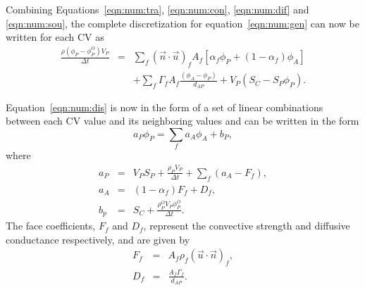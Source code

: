 Combining Equations~\eqref{eqn:num:tra}, \eqref{eqn:num:con},
\eqref{eqn:num:dif} and \eqref{eqn:num:sou}, the complete
discretization for equation~\eqref{eqn:num:gen} can now be written for
each CV as
\begin{eqnarray}
\frac{\rho(\phi_{P} - \phi_P^O) V_P}{\Delta t}
&=&
\sum_{f} (\vec{n} \cdot \vec{u})_f A_f 
\left[\alpha_f \phi_P +\left(1-\alpha_f\right)\phi_A\right]
\\
&&+
\sum_f \Gamma_f A_f \frac{(\phi_A-\phi_P)}{d_{AP}}
+ 
V_P ( S_C - S_P \phi_P ).
\label{eqn:num:dis}
\end{eqnarray}

Equation~\eqref{eqn:num:dis} is now in the form of a set of linear
combinations between each CV value and its neighboring values and can be
written in the form
\begin{equation}
a_P \phi_P = \sum_f a_{A} \phi_{A} + b_P,
\label{eqn:num:dap}
\end{equation}
where
\begin{eqnarray}
a_P & = & V_P S_P + \frac{\rho_P V_P}{\Delta t} + \sum_f (a_{A} -
F_f), \\
a_{A} & = & ( 1 - \alpha_f ) F_f + D_f, \\
b_p & = & S_C + \frac{\rho_P^O V_P \phi_P^O}{\Delta t}.
\end{eqnarray}
The face coefficients, $F_f$ and $D_f$, represent the convective strength
and diffusive conductance respectively, and are given by
\begin{eqnarray}
F_f & = & A_f \rho_f ( \vec{u} \cdot \vec{n} )_f, \\
D_f & = & \frac{A_f \Gamma_f}{d_{AP}} .
\end{eqnarray}












